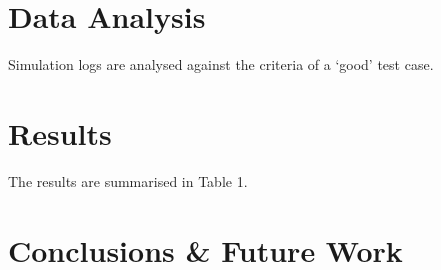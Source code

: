 \documentclass[letterpaper, 10 pt, journal, twoside]{IEEEtran}
\begin{document}
\section{Data Analysis}\label{s:Data Analysis}

Simulation logs are analysed against the criteria of a `good' test case.


\section{Results}\label{s:Results}

The results are summarised in Table 1.





\section{Conclusions \& Future Work}\label{s:conclusion}



\printbibliography
\end{document}
